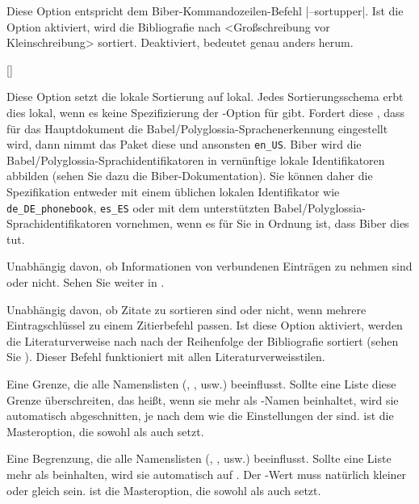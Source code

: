 \documentclass{ltxdockit}[2011/03/25]
\newcommand*{\biber}{Biber\xspace}
\begin{document}
\begin{optionlist}

Diese Option entspricht dem \biber-Kommandozeilen-Befehl |--sortupper|.  Ist die Option aktiviert, wird die
Bibliografie nach <Großschreibung vor Kleinschreibung> sortiert.
Deaktiviert, bedeutet genau anders herum.

[\BiberOnly]

Diese Option setzt die lokale Sortierung auf lokal. Jedes Sortierungsschema
erbt dies lokal, wenn es keine Spezifizierung der -Option für  gibt. Fordert diese , dass für das Hauptdokument
die Babel/Polyglossia-Sprachenerkennung eingestellt wird, dann nimmt das Paket 
diese und ansonsten \texttt{en\_US}. \biber wird die 
Babel/Polyglossia-Sprachidentifikatoren 
in vernünftige lokale Identifikatoren abbilden (sehen Sie dazu die
\biber-Dokumentation). Sie können daher die Spezifikation entweder mit
einem üblichen lokalen Identifikator wie \texttt{de\_DE\_phonebook}, \texttt{es\_ES} 
oder mit dem unterstützten Babel/Polyglossia-Sprachidentifikatoren vornehmen,
wenn es für Sie in Ordnung ist, dass \biber dies tut.


Unabhängig davon, ob Informationen von verbundenen Einträgen zu nehmen sind oder nicht. Sehen Sie weiter in .


Unabhängig davon, ob Zitate zu sortieren sind oder nicht, wenn mehrere Eintragschlüssel 
zu einem Zitierbefehl passen.
Ist diese Option aktiviert, werden die Literaturverweise nach
nach der Reihenfolge der Bibliografie sortiert (sehen Sie ).
Dieser Befehl funktioniert mit allen Literaturverweisstilen.


Eine Grenze, die alle Namenslisten (, , usw.)
beeinflusst. Sollte eine Liste diese Grenze überschreiten, das heißt, wenn sie
mehr als -Namen beinhaltet, wird sie automatisch abgeschnitten, je
nach dem wie die Einstellungen der  sind.  ist
die Masteroption, die sowohl  als auch  setzt.


Eine Begrenzung, die alle Namenslisten (, ,
usw.) beeinflusst. Sollte eine Liste mehr als  beinhalten, wird
sie automatisch auf . Der -Wert muss
natürlich kleiner oder gleich  sein.  ist die
Masteroption, die sowohl  als auch  setzt.


\end{optionlist}
\end{document}
